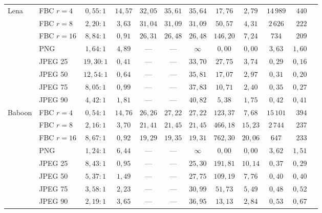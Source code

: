 \begin{table}[H]
\begin{tabular}{llccccccccrr}
        Lena       & FBC $r{=}4$  & $0,55{:}1$  & $14,57$ & $32,05$ & $35,61$ & $35,64$ & $17,76$   & $2,79$  & $14\,989$ & $440$   \\
                   & FBC $r{=}8$  & $2,20{:}1$  & $3,63$  & $31,04$ & $31,09$ & $31,09$ & $50,57$   & $4,31$  & $2\,626$  & $222$   \\
                   & FBC $r{=}16$ & $8,84{:}1$  & $0,91$  & $26,31$ & $26,48$ & $26,48$ & $146,20$  & $7,24$  & $734$     & $209$   \\
                   & PNG          & $1,64{:}1$  & $4,89$  & ---     & ---     & $\infty$ & $0,00$   & $0,00$  & $3,63$    & $1,60$  \\
                   & JPEG 25      & $19,30{:}1$ & $0,41$  & ---     & ---     & $33,70$ & $27,75$   & $3,74$  & $0,29$    & $0,16$  \\
                   & JPEG 50      & $12,54{:}1$ & $0,64$  & ---     & ---     & $35,81$ & $17,07$   & $2,97$  & $0,31$    & $0,20$  \\
                   & JPEG 75      & $8,05{:}1$  & $0,99$  & ---     & ---     & $37,83$ & $10,71$   & $2,40$  & $0,35$    & $0,27$  \\
                   & JPEG 90      & $4,42{:}1$  & $1,81$  & ---     & ---     & $40,82$ & $5,38$    & $1,75$  & $0,42$    & $0,41$  \\
        \midrule

        Baboon     & FBC $r{=}4$  & $0,54{:}1$  & $14,76$ & $26,26$ & $27,22$ & $27,22$ & $123,37$  & $7,68$  & $15\,101$ & $394$   \\
                   & FBC $r{=}8$  & $2,16{:}1$  & $3,70$  & $21,41$ & $21,45$ & $21,45$ & $466,18$  & $15,23$ & $2\,744$  & $237$   \\
                   & FBC $r{=}16$ & $8,67{:}1$  & $0,92$  & $19,29$ & $19,35$ & $19,31$ & $762,30$  & $20,06$ & $647$     & $233$   \\
                   & PNG          & $1,24{:}1$  & $6,44$  & ---     & ---     & $\infty$ & $0,00$   & $0,00$  & $3,62$    & $1,51$  \\
                   & JPEG 25      & $8,43{:}1$  & $0,95$  & ---     & ---     & $25,30$ & $191,81$  & $10,14$ & $0,37$    & $0,29$  \\
                   & JPEG 50      & $5,37{:}1$  & $1,49$  & ---     & ---     & $27,75$ & $109,19$  & $7,76$  & $0,40$    & $0,40$  \\
                   & JPEG 75      & $3,58{:}1$  & $2,23$  & ---     & ---     & $30,99$ & $51,73$   & $5,49$  & $0,48$    & $0,52$  \\
                   & JPEG 90      & $2,19{:}1$  & $3,65$  & ---     & ---     & $36,95$ & $13,13$   & $2,84$  & $0,53$    & $0,67$  \\
        \midrule


\end{tabular}
\end{table}

